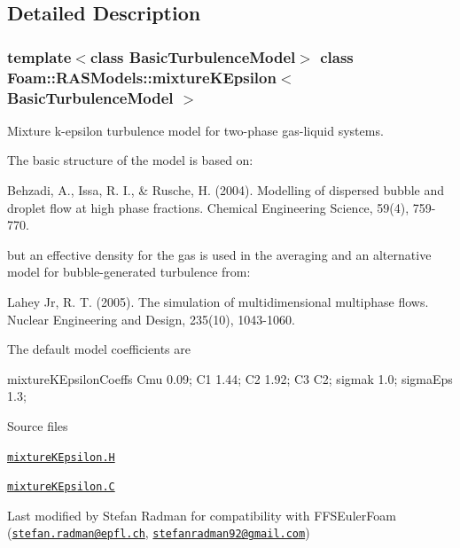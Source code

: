 \subsection{Detailed Description}
\subsubsection*{template$<$class Basic\+Turbulence\+Model$>$\newline
class Foam\+::\+R\+A\+S\+Models\+::mixture\+K\+Epsilon$<$ Basic\+Turbulence\+Model $>$}

Mixture k-\/epsilon turbulence model for two-\/phase gas-\/liquid systems. 

\label{_Description}%
 The basic structure of the model is based on\+: \begin{DoxyVerb}    Behzadi, A., Issa, R. I., & Rusche, H. (2004).
    Modelling of dispersed bubble and droplet flow at high phase fractions.
    Chemical Engineering Science, 59(4), 759-770.
\end{DoxyVerb}


but an effective density for the gas is used in the averaging and an alternative model for bubble-\/generated turbulence from\+: \begin{DoxyVerb}    Lahey Jr, R. T. (2005).
    The simulation of multidimensional multiphase flows.
    Nuclear Engineering and Design, 235(10), 1043-1060.
\end{DoxyVerb}


The default model coefficients are \begin{DoxyVerb}    mixtureKEpsilonCoeffs
    {
        Cmu         0.09;
        C1          1.44;
        C2          1.92;
        C3          C2;
        sigmak      1.0;
        sigmaEps    1.3;
    }
\end{DoxyVerb}


\begin{DoxyParagraph}{Source files}

\begin{DoxyItemize}
\item \href{../../../home/carlo/data/GeN-Foam/GeN-Foam_ffn/GeN-Foam/GeN-Foam/classes/thermalHydraulics/src/physicsModels/turbulenceModels/mixtureKEpsilon/mixtureKEpsilon.H}{\tt mixture\+K\+Epsilon.\+H} 
\item \href{../../../home/carlo/data/GeN-Foam/GeN-Foam_ffn/GeN-Foam/GeN-Foam/classes/thermalHydraulics/src/physicsModels/turbulenceModels/mixtureKEpsilon/mixtureKEpsilon.C}{\tt mixture\+K\+Epsilon.\+C} 
\end{DoxyItemize}Last modified by Stefan Radman for compatibility with F\+F\+S\+Euler\+Foam (\href{mailto:stefan.radman@epfl.ch}{\tt stefan.\+radman@epfl.\+ch}, \href{mailto:stefanradman92@gmail.com}{\tt stefanradman92@gmail.\+com}) 
\end{DoxyParagraph}


